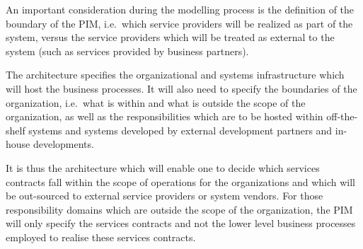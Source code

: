 An important consideration during the modelling process is the definition of the
boundary of the PIM, i.e.\ which service providers will be realized as part of the
system, versus the service providers which will be treated as external to the
system (such as services provided by business partners).

The architecture specifies the organizational and systems infrastructure which
will host the business processes. It will also need to specify the boundaries of
the organization, i.e.\ what is within and what is outside the scope of the
organization, as well as the responsibilities which are to be hosted within
off-the-shelf systems and systems developed by external development partners
and in-house developments.

It is thus the architecture which will enable one to decide which
services contracts fall within the scope of operations for the organizations and
which will be out-sourced to external service providers or system vendors. For
those responsibility domains which are outside the scope of the organization,
the PIM will only specify the services contracts and not the lower level
business processes employed to realise these services contracts.
